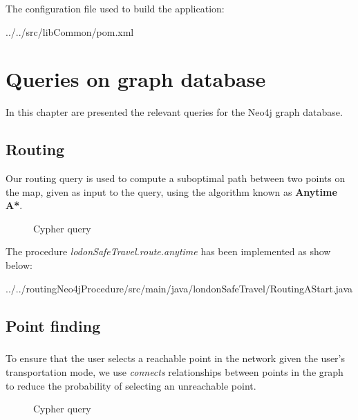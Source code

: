 The configuration file used to build the application:


{../../src/libCommon/pom.xml}

\chapter{Queries on graph database}

In this chapter are presented the relevant queries for the
Neo4j graph database.

\section{Routing}

Our routing query is used to compute a suboptimal path between two points on the map, given as input to the query, using the algorithm known as \textbf{Anytime A*}.

\begin{figure}[H]
	
	\caption{Cypher query}
\end{figure} 

The procedure \textit{lodonSafeTravel.route.anytime} has been implemented as show below:


	{../../routingNeo4jProcedure/src/main/java/londonSafeTravel/RoutingAStart.java}

\section{Point finding}
\label{query:geosearch}

\paragraph{}
To ensure that the user selects a reachable point in the network given the user's transportation mode, we use \textit{connects} relationships between points in the graph to reduce the probability of selecting an unreachable point.

\begin{figure}[H]
	
	\caption{Cypher query}
\end{figure} 

